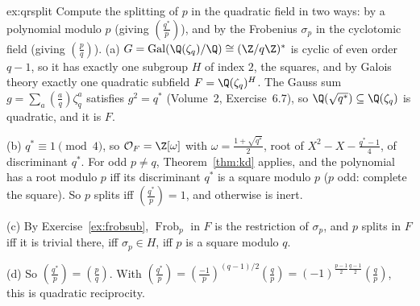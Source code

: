 \begin{solution}{ex:qrsplit}
\idea Compute the splitting of $p$ in the quadratic field in two ways: by a polynomial modulo $p$ (giving
$\left(\frac{q^*}p\right)$), and by the Frobenius $\sigma_p$ in the cyclotomic field (giving $\left(\frac pq\right)$).
\writeup (a) $G=\operatorname{Gal}(\Q(\zeta_q)/\Q)\cong(\Z/q\Z)^*$ is cyclic of even order $q-1$, so it has exactly one
subgroup $H$ of index $2$, the squares, and by Galois theory exactly one quadratic subfield $F=\Q(\zeta_q)^H$. The Gauss
sum $g=\sum_a\left(\frac aq\right)\zeta_q^a$ satisfies $g^2=q^*$ (Volume~2, Exercise~6.7), so $\Q(\sqrt{q^*})\subseteq
\Q(\zeta_q)$ is quadratic, and it is $F$.

(b) $q^*\equiv1\pmod 4$, so $\mathcal O_F=\Z[\omega]$ with $\omega=\frac{1+\sqrt{q^*}}2$, root of $X^2-X-\frac{q^*-1}4$, of
discriminant $q^*$. For odd $p\ne q$, Theorem~\ref{thm:kd} applies, and the polynomial has a root modulo $p$ iff its
discriminant $q^*$ is a square modulo $p$ ($p$ odd: complete the square). So $p$ splits iff $\left(\frac{q^*}p\right)=1$,
and otherwise is inert.

(c) By Exercise~\ref{ex:frobsub}, $\operatorname{Frob}_p$ in $F$ is the restriction of $\sigma_p$, and $p$ splits in $F$
iff it is trivial there, iff $\sigma_p\in H$, iff $p$ is a square modulo $q$.

(d) So $\left(\frac{q^*}p\right)=\left(\frac pq\right)$. With $\left(\frac{q^*}p\right)=\left(\frac{-1}p\right)^{(q-1)/2}
\left(\frac qp\right)=(-1)^{\frac{p-1}2\frac{q-1}2}\left(\frac qp\right)$, this is quadratic reciprocity.
\end{solution}

